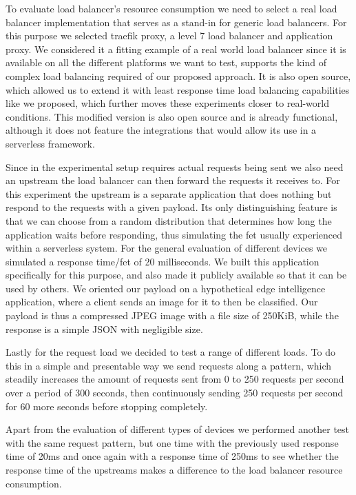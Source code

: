 \documentclass[draft,final]{vutinfth} %
\begin{document}
To evaluate load balancer's resource consumption we need to select a real load balancer implementation that serves as a stand-in for generic load balancers.
For this purpose we selected traefik proxy\cite{traefik}, a level 7 load balancer and application proxy.
We considered it a fitting example of a real world load balancer since it is available on all the different platforms we want to test, supports the kind of complex load balancing required of our proposed approach.
It is also open source, which allowed us to extend it with least response time load balancing capabilities like we proposed, which further moves these experiments closer to real-world conditions.
This modified version\cite{traefik-jjnp} is also open source and is already functional, although it does not feature the integrations that would allow its use in a serverless framework.

Since in the experimental setup requires actual requests being sent we also need an upstream the load balancer can then forward the requests it receives to.
For this experiment the upstream is a separate application that does nothing but respond to the requests with a given payload.
Its only distinguishing feature is that we can choose from a random distribution that determines how long the application waits before responding, thus simulating the \gls{fet} usually experienced within a serverless system.
For the general evaluation of different devices we simulated a response time/\gls{fet} of 20 milliseconds.
We built this application specifically for this purpose, and also made it publicly available\cite{palecekResponder2021} so that it can be used by others.
We oriented our payload on a hypothetical edge intelligence application, where a client sends an image for it to then be classified.
Our payload is thus a compressed JPEG image with a file size of 250KiB, while the response is a simple JSON with negligible size.

Lastly for the request load we decided to test a range of different loads.
To do this in a simple and presentable way we send requests along a pattern, which steadily increases the amount of requests sent from 0 to 250 requests per second over a period of 300 seconds, then continuously sending 250 requests per second for 60 more seconds before stopping completely.

Apart from the evaluation of different types of devices we performed another test with the same request pattern, but one time with the previously used response time of 20ms and once again with a response time of 250ms to see whether the response time of the upstreams makes a difference to the load balancer resource consumption.
\end{document}
